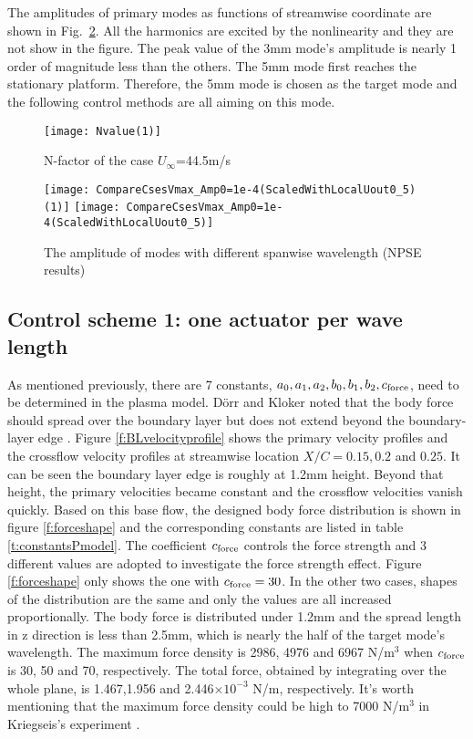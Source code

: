 \documentclass{AIAA}
\begin{document}
The amplitudes of primary modes as functions of streamwise coordinate are shown in Fig.~\ref{f:NPSE}. All the harmonics are excited by the nonlinearity and they are not show in the figure. The peak value of the 3mm mode's amplitude is nearly 1 order of magnitude less than the others. The 5mm mode first reaches the stationary platform. Therefore, the 5mm mode is chosen as the target mode and the following control methods are all aiming on this mode.
\begin{figure}
\centering
  \texttt{[image: Nvalue(1)]}
  \caption{N-factor of the case $U_\infty$=44.5m/s}%
  \label{fig:Nfactor445}
\end{figure}
\begin{figure}
\centering
  \texttt{[image: CompareCsesVmax\_Amp0=1e-4(ScaledWithLocalUout0\_5)(1)]} \texttt{[image: CompareCsesVmax\_Amp0=1e-4(ScaledWithLocalUout0\_5)]}
  \caption{The amplitude of modes with different spanwise wavelength (NPSE results)}\label{f:NPSE}%
\end{figure}

\subsection{Control scheme 1: one actuator per wave length}\label{subs:control1}
As mentioned previously, there are 7 constants, $a_0,a_1,a_2,b_0,b_1,b_2,c_{\rm force}$, need to be determined in the plasma model. D\"orr and Kloker noted that the body force should spread over the boundary layer but does not extend beyond the boundary-layer edge \cite{dorr2015stabilisation}. Figure \ref{f:BLvelocityprofile} shows the primary velocity profiles and the crossflow velocity profiles at streamwise location $X/C=0.15,0.2$ and $0.25$. It can be seen the boundary layer edge is roughly at 1.2mm height. Beyond that height, the primary velocities became constant and the crossflow velocities vanish quickly. Based on this base flow, the designed body force distribution is shown in figure \ref{f:forceshape} and the corresponding constants are listed in table \ref{t:constantsPmodel}. The coefficient $c_{\rm force}$ controls the force strength and 3 different values are adopted to investigate the force strength effect. Figure \ref{f:forceshape} only shows the one with $c_{\rm force}=30$. In the other two cases, shapes of the distribution are the same and only the values are all increased proportionally. The body force is distributed under 1.2mm and the spread length in z direction is less than 2.5mm, which is nearly the half of the target mode's wavelength. The maximum force density is 2986, 4976 and 6967 N/m$^3$ when $c_{\rm force}$ is 30, 50 and 70, respectively. The total force, obtained by integrating over the whole plane, is 1.467,1.956 and 2.446$\times 10^{-3}$ N/m, respectively. It's worth mentioning that the maximum force density could be high to 7000 N/m$^3$ in Kriegseis's experiment \cite{Kriegseis2013velocity}.
\end{document}
